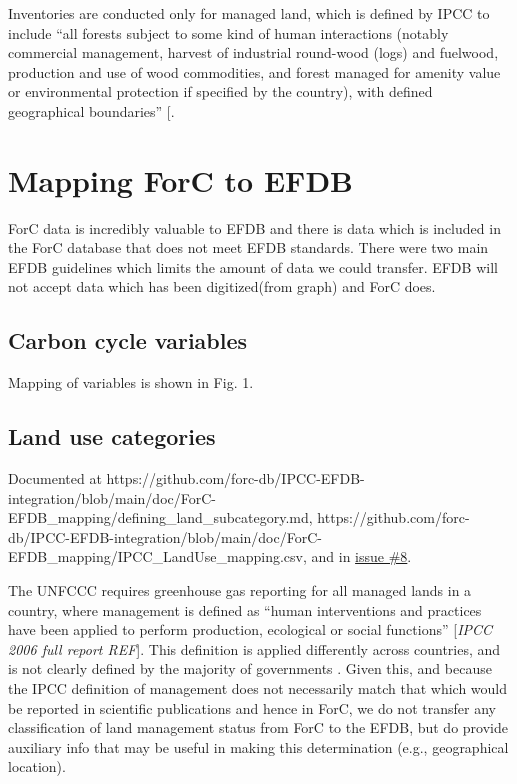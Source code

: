 \documentclass[, manuscript]{copernicus}
\begin{document}
Inventories are conducted only for managed land, which is defined by
IPCC to include ``all forests subject to some kind of human interactions
(notably commercial management, harvest of industrial round-wood (logs)
and fuelwood, production and use of wood commodities, and forest managed
for amenity value or environmental protection if specified by the
country), with defined geographical boundaries''
{[}\citet{ipcc_good_2003}.

\section{Mapping ForC to EFDB}

ForC data is incredibly valuable to EFDB and there is data which is
included in the ForC database that does not meet EFDB standards. There
were two main EFDB guidelines which limits the amount of data we could
transfer. EFDB will not accept data which has been digitized(from graph)
and ForC does.

\subsection{Carbon cycle variables}

Mapping of variables is shown in Fig. 1.

\subsection{Land use categories}

Documented at
https://github.com/forc-db/IPCC-EFDB-integration/blob/main/doc/ForC-EFDB\_mapping/defining\_land\_subcategory.md,
https://github.com/forc-db/IPCC-EFDB-integration/blob/main/doc/ForC-EFDB\_mapping/IPCC\_LandUse\_mapping.csv,
and in
\href{https://github.com/forc-db/IPCC_database_integration/issues/8}{issue
\#8}.

The UNFCCC requires greenhouse gas reporting for all managed lands in a
country, where management is defined as ``human interventions and
practices have been applied to perform production, ecological or social
functions'' {[}\emph{IPCC 2006 full report REF}{]}. This definition is
applied differently across countries, and is not clearly defined by the
majority of governments \citep{ogle_delineating_2018}. Given this, and
because the IPCC definition of management does not necessarily match
that which would be reported in scientific publications and hence in
ForC, we do not transfer any classification of land management status
from ForC to the EFDB, but do provide auxiliary info that may be useful
in making this determination (e.g., geographical location).
\end{document}
